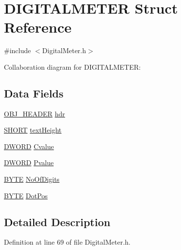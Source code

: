\hypertarget{struct_d_i_g_i_t_a_l_m_e_t_e_r}{}\section{D\+I\+G\+I\+T\+A\+L\+M\+E\+T\+E\+R Struct Reference}
\label{struct_d_i_g_i_t_a_l_m_e_t_e_r}


{\ttfamily \#include $<$Digital\+Meter.\+h$>$}



Collaboration diagram for D\+I\+G\+I\+T\+A\+L\+M\+E\+T\+E\+R\+:
\subsection*{Data Fields}
\begin{DoxyCompactItemize}
\item 
\hyperlink{struct_o_b_j___h_e_a_d_e_r}{O\+B\+J\+\_\+\+H\+E\+A\+D\+E\+R} \hyperlink{struct_d_i_g_i_t_a_l_m_e_t_e_r_abeffaf353197a8a64fba6707b68ce0be}{hdr}
\item 
\hyperlink{_generic_type_defs_8h_ae9bb25d3afecf3bfab0fbe3c22c2050f}{S\+H\+O\+R\+T} \hyperlink{struct_d_i_g_i_t_a_l_m_e_t_e_r_a40fa9c35391b0005032180b85e7afd34}{text\+Height}
\item 
\hyperlink{_generic_type_defs_8h_ad342ac907eb044443153a22f964bf0af}{D\+W\+O\+R\+D} \hyperlink{struct_d_i_g_i_t_a_l_m_e_t_e_r_a92ef4d66b7dba9000075b46b43bdf434}{Cvalue}
\item 
\hyperlink{_generic_type_defs_8h_ad342ac907eb044443153a22f964bf0af}{D\+W\+O\+R\+D} \hyperlink{struct_d_i_g_i_t_a_l_m_e_t_e_r_ae00862ee1a0994073ae54ceddebcfb15}{Pvalue}
\item 
\hyperlink{_generic_type_defs_8h_a4ae1dab0fb4b072a66584546209e7d58}{B\+Y\+T\+E} \hyperlink{struct_d_i_g_i_t_a_l_m_e_t_e_r_a5d4b34b0970e042684ba6b74c435b834}{No\+Of\+Digits}
\item 
\hyperlink{_generic_type_defs_8h_a4ae1dab0fb4b072a66584546209e7d58}{B\+Y\+T\+E} \hyperlink{struct_d_i_g_i_t_a_l_m_e_t_e_r_a55b03670ffa9e2f2fce352725acc85bb}{Dot\+Pos}
\end{DoxyCompactItemize}


\subsection{Detailed Description}


Definition at line 69 of file Digital\+Meter.\+h.



